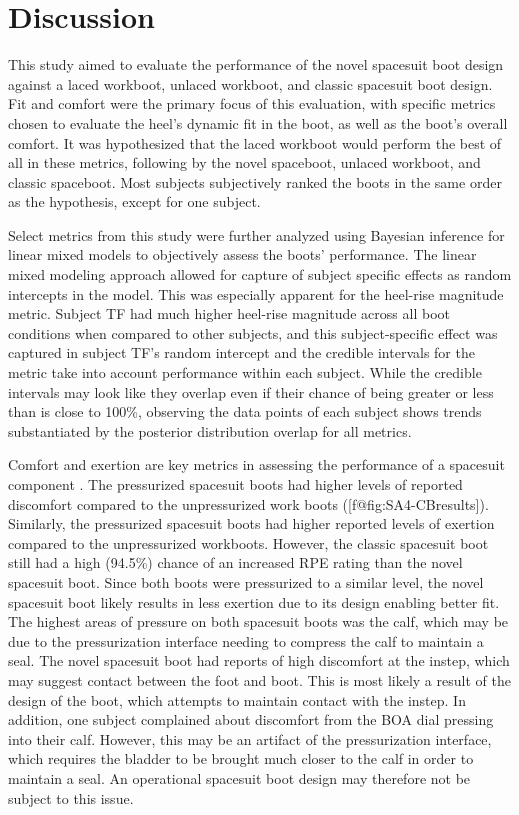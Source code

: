 \documentclass[defaultstyle,11pt]{thesis}
\begin{document}
\hypertarget{discussion-1}{%
\section{Discussion}\label{discussion-1}}

This study aimed to evaluate the performance of the novel spacesuit boot design against a laced workboot, unlaced workboot, and classic spacesuit boot design.
Fit and comfort were the primary focus of this evaluation, with specific metrics chosen to evaluate the heel's dynamic fit in the boot, as well as the boot's overall comfort.
It was hypothesized that the laced workboot would perform the best of all in these metrics, following by the novel spaceboot, unlaced workboot, and classic spaceboot.
Most subjects subjectively ranked the boots in the same order as the hypothesis, except for one subject.

Select metrics from this study were further analyzed using Bayesian inference for linear mixed models to objectively assess the boots' performance.
The linear mixed modeling approach allowed for capture of subject specific effects as random intercepts in the model.
This was especially apparent for the heel-rise magnitude metric.
Subject TF had much higher heel-rise magnitude across all boot conditions when compared to other subjects, and this subject-specific effect was captured in subject TF's random intercept and the credible intervals for the metric take into account performance within each subject.
While the credible intervals may look like they overlap even if their chance of being greater or less than is close to 100\%, observing the data points of each subject shows trends substantiated by the posterior distribution overlap for all metrics.

Comfort and exertion are key metrics in assessing the performance of a spacesuit component \citep{Abercromby2012, Chappell2017}.
The pressurized spacesuit boots had higher levels of reported discomfort compared to the unpressurized work boots ({[}f@fig:SA4-CBresults{]}).
Similarly, the pressurized spacesuit boots had higher reported levels of exertion compared to the unpressurized workboots.
However, the classic spacesuit boot still had a high (94.5\%) chance of an increased RPE rating than the novel spacesuit boot.
Since both boots were pressurized to a similar level, the novel spacesuit boot likely results in less exertion due to its design enabling better fit.
The highest areas of pressure on both spacesuit boots was the calf, which may be due to the pressurization interface needing to compress the calf to maintain a seal.
The novel spacesuit boot had reports of high discomfort at the instep, which may suggest contact between the foot and boot.
This is most likely a result of the design of the boot, which attempts to maintain contact with the instep.
In addition, one subject complained about discomfort from the BOA dial pressing into their calf.
However, this may be an artifact of the pressurization interface, which requires the bladder to be brought much closer to the calf in order to maintain a seal.
An operational spacesuit boot design may therefore not be subject to this issue.
\end{document}
